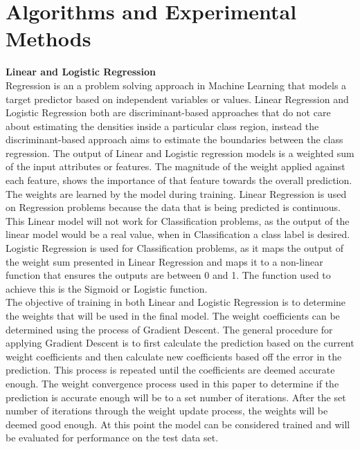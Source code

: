 \documentclass[twoside,11pt]{article}
\begin{document}
\section{Algorithms and Experimental Methods}
\hspace*{10mm} \textbf{Linear and Logistic Regression}\\
\hspace*{10mm} Regression is an a problem solving approach in Machine Learning that models a target predictor based on independent variables or values.  Linear Regression and Logistic Regression both are discriminant-based approaches that do not care about estimating the densities inside a particular class region, instead the discriminant-based approach aims to estimate the boundaries between the class regression. The output of Linear and Logistic regression models is a weighted sum of the input attributes or features. The magnitude of the weight applied against each feature, shows the importance of that feature towards the overall prediction. The weights are learned by the model during training. Linear Regression is used on Regression problems because the data that is being predicted is continuous. This Linear model will not work for Classification problems, as the output of the linear model would be a real value, when in Classification a class label is desired. Logistic Regression is used for Classification problems, as it maps the output of the weight sum presented in Linear Regression and maps it to a non-linear function that ensures the outputs are between 0 and 1. The function used to achieve this is the Sigmoid or Logistic function.\\
\hspace*{10mm} The objective of training in both Linear and Logistic Regression is to determine the weights that will be used in the final model. The weight coefficients can be determined using the process of Gradient Descent. The general procedure for applying Gradient Descent is to first calculate the prediction based on the current weight coefficients and then calculate new coefficients based off the error in the prediction. This process is repeated until the coefficients are deemed accurate enough. The weight convergence process used in this paper to determine if the prediction is accurate enough will be to a set number of iterations. After the set number of iterations through the weight update process, the weights will be deemed good enough. At this point the model can be considered trained and will be evaluated for performance on the test data set.
\newpage
\end{document}
